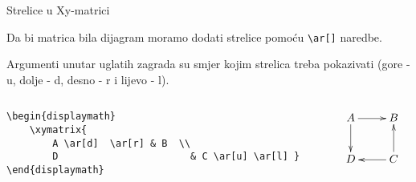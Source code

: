 \begin{frame}{Strelice u Xy-matrici}

 Da bi matrica bila dijagram moramo dodati strelice pomoću \verb|\ar[]| naredbe.\newline

 Argumenti unutar uglatih zagrada su smjer kojim strelica treba pokazivati (gore - u, dolje - d, desno - r i lijevo - l).

\begin{columns}[c]

\begin{column}{0.5\textwidth}

\begin{Verbatim}[fontsize=\tiny]
\begin{displaymath}
    \xymatrix{
        A \ar[d]  \ar[r] & B  \\
        D                       & C \ar[u] \ar[l] }
\end{displaymath}
\end{Verbatim}

\end{column}

\begin{column}{0.5\textwidth}%

\begin{displaymath}
    \xymatrix{
        A \ar[d] \ar[r] & B \\
        D    & C \ar[u] \ar[l] }
\end{displaymath}

\end{column}

\end{columns}

\end{frame}

